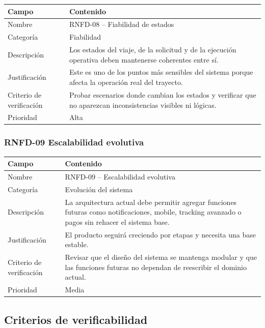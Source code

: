 \documentclass[12pt]{article}
\begin{document}
\begin{tabularx}{\textwidth}{|P{3.3cm}|Y|}
\hline
{}
\textbf{Campo} & \textbf{Contenido} \\
\hline
Nombre & RNFD-08 -- Fiabilidad de estados \\
\hline
Categor\'ia & Fiabilidad \\
\hline
Descripci\'on & Los estados del viaje, de la solicitud y de la ejecuci\'on operativa deben mantenerse coherentes entre s\'i. \\
\hline
Justificaci\'on & Este es uno de los puntos m\'as sensibles del sistema porque afecta la operaci\'on real del trayecto. \\
\hline
Criterio de verificaci\'on & Probar escenarios donde cambian los estados y verificar que no aparezcan inconsistencias visibles ni l\'ogicas. \\
\hline
Prioridad & Alta \\
\hline
\end{tabularx}

\subsubsection{RNFD-09 Escalabilidad evolutiva}

\begin{tabularx}{\textwidth}{|P{3.3cm}|Y|}
\hline
{}
\textbf{Campo} & \textbf{Contenido} \\
\hline
Nombre & RNFD-09 -- Escalabilidad evolutiva \\
\hline
Categor\'ia & Evoluci\'on del sistema \\
\hline
Descripci\'on & La arquitectura actual debe permitir agregar funciones futuras como notificaciones, mobile, tracking avanzado o pagos sin rehacer el sistema base. \\
\hline
Justificaci\'on & El producto seguir\'a creciendo por etapas y necesita una base estable. \\
\hline
Criterio de verificaci\'on & Revisar que el dise\~no del sistema se mantenga modular y que las funciones futuras no dependan de reescribir el dominio actual. \\
\hline
Prioridad & Media \\
\hline
\end{tabularx}

\subsection{Criterios de verificabilidad}
\end{document}
